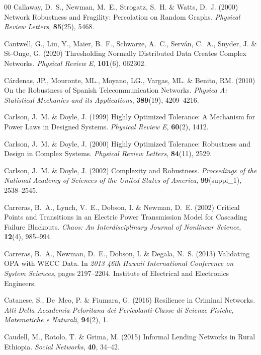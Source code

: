 \documentclass{comnet-mod}
\begin{document}
\begin{thebibliography}{00}
Callaway, D.~S., Newman, M.~E., Strogatz, S.~H. {\&} Watts, D.~J. (2000)
  {Network Robustness and Fragility: {{Percolation}} on Random Graphs}. {\em
  {Physical Review Letters}}, \textbf{85}(25), 5468.

Cantwell, G., Liu, Y., Maier, B.~F., Schwarze, A.~C., Serv{\'a}n, C.~A.,
  Snyder, J. {\&} {St-Onge}, G. (2020)  {Thresholding Normally Distributed Data
  Creates Complex Networks}. {\em {Physical Review E}}, \textbf{101}(6),
  062302.

C{\'a}rdenas, {\relax JP}., Mouronte, {\relax ML}., Moyano, {\relax LG}.,
  Vargas, {\relax ML}. {\&} Benito, {\relax RM}. (2010)  {On the Robustness of
  {{Spanish}} Telecommunication Networks}. {\em {Physica A: Statistical
  Mechanics and its Applications}}, \textbf{389}(19), 4209--4216.

Carlson, J.~M. {\&} Doyle, J. (1999)  {Highly Optimized Tolerance: {{A}}
  Mechanism for Power Laws in Designed Systems}. {\em {Physical Review E}},
  \textbf{60}(2), 1412.

Carlson, J.~M. {\&} Doyle, J. (2000)  {Highly Optimized Tolerance:
  {{Robustness}} and Design in Complex Systems}. {\em {Physical Review
  Letters}}, \textbf{84}(11), 2529.

Carlson, J.~M. {\&} Doyle, J. (2002)  {Complexity and Robustness}. {\em
  {Proceedings of the National Academy of Sciences of the United States of
  America}}, \textbf{99}(suppl\_1), 2538--2545.

Carreras, B.~A., Lynch, V.~E., Dobson, I. {\&} Newman, D.~E. (2002)  {Critical
  Points and Transitions in an Electric Power Transmission Model for Cascading
  Failure Blackouts}. {\em {Chaos: An Interdisciplinary Journal of Nonlinear
  Science}}, \textbf{12}(4), 985--994.

Carreras, B.~A., Newman, D.~E., Dobson, I. {\&} Degala, N.~S. (2013)
  {Validating {{OPA}} with {{WECC}} Data}. In {\em {2013 46th Hawaii
  International Conference on System Sciences}}, pages 2197--2204. {Institute
  of Electrical and Electronics Engineers}.

Catanese, S., De~Meo, P. {\&} Fiumara, G. (2016)  {Resilience in Criminal
  Networks}. {\em {Atti Della Accademia Peloritana dei Pericolanti-Classe di
  Scienze Fisiche, Matematiche e Naturali}}, \textbf{94}(2), 1.

Caudell, M., Rotolo, T. {\&} Grima, M. (2015)  {Informal Lending Networks in
  Rural {{Ethiopia}}}. {\em {Social Networks}}, \textbf{40}, 34--42.


\end{thebibliography}
\end{document}
